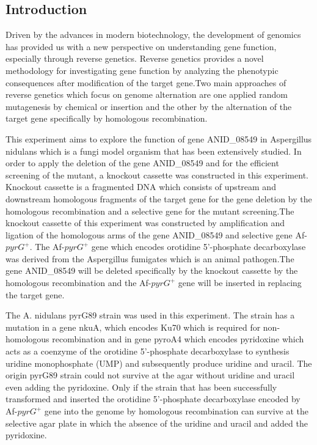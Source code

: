 \documentclass[a4paper,10pt]{article}
\begin{document}
\begin{multicols}{2}
\section{Introduction}


Driven by the advances in modern biotechnology, the development of genomics has provided us with a new perspective on understanding gene function, especially through reverse genetics. Reverse genetics provides a novel methodology for investigating gene function by analyzing the phenotypic consequences after modification of the target gene\cite{hardy2010reverse}.Two main approaches of reverse genetics which focus on genome alternation are one applied random mutagenesis by chemical or insertion and the other by the alternation of the target gene specifically by homologous recombination\cite{hardy2010reverse}.

This experiment aims to explore the function of gene ANID\_08549 in Aspergillus nidulans which is a fungi model organism that has been extensively studied\cite{son2023regulators}. In order to apply the deletion of the gene ANID\_08549 and for the efficient screening of the mutant, a knockout cassette was constructed in this experiment. Knockout cassette is a fragmented DNA which consists of upstream and downstream homologous fragments of the target gene for the gene deletion by the homologous recombination and a selective gene for the mutant screening\cite{xiaoli2015efficient}.The knockout cassette of this experiment was constructed by amplification and ligation of the homologous arms of the gene ANID\_08549 and selective gene Af-$pyrG^+$. The Af-$pyrG^+$ gene which encodes orotidine 5'-phosphate decarboxylase was derived from the Aspergillus fumigates which is an animal pathogen\cite{d1996selection}\cite{wassano2020aspergillus}.The gene ANID\_08549 will be deleted specifically by the knockout cassette by the homologous recombination and the Af-$pyrG^+$ gene will be inserted in replacing the target gene.

The A. nidulans pyrG89 strain was used in this experiment. The strain has a mutation in a gene nkuA, which encodes Ku70 which is required for non-homologous recombination and in gene pyroA4 which encodes pyridoxine which acts as a coenzyme of the orotidine 5'-phosphate decarboxylase to synthesis uridine monophosphate (UMP) and subsequently produce uridine and uracil\cite{yee2022investigating}. The origin pyrG89 strain could not survive at the agar without uridine and uracil even adding the pyridoxine\cite{nayak2006versatile}. Only if the strain that has been successfully transformed and inserted the orotidine 5'-phosphate decarboxylase encoded by Af-$pyrG^+$ gene into the genome by homologous recombination can survive at the selective agar plate in which the absence of the uridine and uracil and added the pyridoxine.



\end{multicols}
\end{document}
